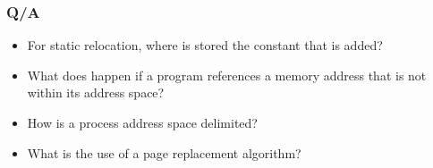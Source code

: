   \begin{frame}
    \frametitle{Q/A}
    \begin{itemize}
      \item For static relocation, where is stored the constant that is added? %
      \item What does happen if a program references a memory address that is not within its address space? %
      \item How is a process address space delimited? %
      \item What is the use of a page replacement algorithm? %
    \end{itemize}
  \end{frame}
